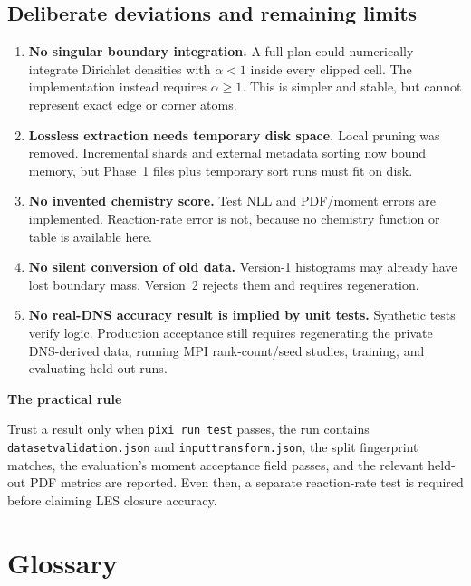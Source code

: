 \documentclass[11pt,a4paper]{report}
\newcommand{\code}[1]{\texttt{#1}}
\renewcommand{\_}{\origtextunderscore\allowbreak}
\newlength{\calloutwidth}
\newcommand{\calloutOpen}{%
  \par\medskip\noindent
  \setlength{\calloutwidth}{\dimexpr\linewidth-2\fboxsep\relax}%
  \begin{lrbox}{\calloutbox}\begin{minipage}{\calloutwidth}}
\newcommand{\calloutClose}[1]{%
  \end{minipage}\end{lrbox}\colorbox{#1}{\usebox{\calloutbox}}\par\medskip}
\newenvironment{plainbox}[1]
  {\calloutOpen\textbf{#1}\par\medskip}
  {\calloutClose{BoxBG}}
\begin{document}
\section{Deliberate deviations and remaining limits}

\begin{enumerate}
  \item \textbf{No singular boundary integration.} A full plan could numerically integrate
        Dirichlet densities with $\alpha<1$ inside every clipped cell. The implementation instead
        requires $\alpha\geq1$. This is simpler and stable, but cannot represent exact edge or
        corner atoms.
  \item \textbf{Lossless extraction needs temporary disk space.} Local pruning was removed.
        Incremental shards and external metadata sorting now bound memory, but Phase~1 files
        plus temporary sort runs must fit on disk.
  \item \textbf{No invented chemistry score.} Test NLL and PDF/moment errors are implemented.
        Reaction-rate error is not, because no chemistry function or table is available here.
  \item \textbf{No silent conversion of old data.} Version-1 histograms may already have lost
        boundary mass. Version~2 rejects them and requires regeneration.
  \item \textbf{No real-DNS accuracy result is implied by unit tests.} Synthetic tests verify
        logic. Production acceptance still requires regenerating the private DNS-derived data,
        running MPI rank-count/seed studies, training, and evaluating held-out runs.
\end{enumerate}

\begin{plainbox}{The practical rule}
Trust a result only when \code{pixi run test} passes, the run contains
\code{dataset\_validation.json} and \code{input\_transform.json}, the split fingerprint matches,
the evaluation's moment acceptance field passes, and the relevant held-out PDF metrics are
reported. Even then, a separate reaction-rate test is required before claiming LES closure
accuracy.
\end{plainbox}

\chapter*{Glossary}
\end{document}
